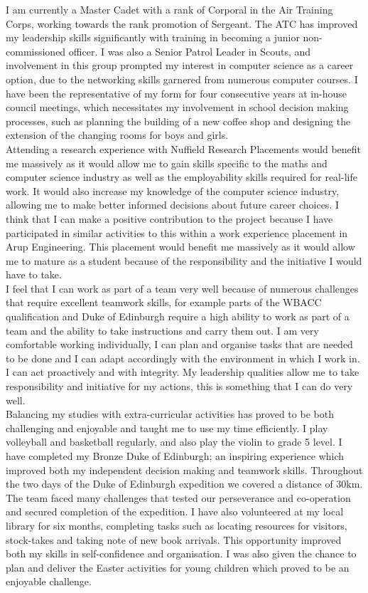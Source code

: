 \documentclass{article}
\begin{document}
I am currently a Master Cadet with a rank of Corporal in the Air
Training Corps, working towards the rank promotion of Sergeant. The ATC has
improved my leadership skills significantly with training in becoming a junior
non-commissioned officer. I was also a Senior Patrol Leader in Scouts, and
involvement in this group prompted my interest in computer science as a career
option, due to the networking skills garnered from numerous computer courses. I
have been the representative of my form for four consecutive years at in-house
council meetings, which necessitates my involvement in school decision making
processes, such as planning the building of a new coffee shop and designing the
extension of the changing rooms for boys and girls.\\

Attending a research experience with Nuffield Research Placements would benefit
me massively as it would allow me to gain skills specific to the maths and
computer science industry as well as the employability skills required for
real-life work. It would also increase my knowledge of the computer science
industry, allowing me to make better informed decisions about future career
choices. I think that I can make a positive contribution to the project because
I have participated in similar activities to this within a work experience
placement in Arup Engineering. This placement would benefit me massively as it
would allow me to mature as a student because of the responsibility and the
initiative I would have to take.\\

I feel that I can work as part of a team very well because of numerous
challenges that require excellent teamwork skills, for example parts of the
WBACC qualification and Duke of Edinburgh require a high ability to work as part
of a team and the ability to take instructions and carry them out. I am very
comfortable working individually, I can plan and organise tasks that are needed
to be done and I can adapt accordingly with the environment in which I work in.
I can act proactively and with integrity. My leadership qualities allow me to
take responsibility and initiative for my actions, this is something that I can
do very well.\\

Balancing my studies with extra-curricular activities has proved to be both
challenging and enjoyable and taught me to use my time efficiently. I play
volleyball and basketball regularly, and also play the violin to grade 5 level.
I have completed my Bronze Duke of Edinburgh; an inspiring experience which
improved both my independent decision making and teamwork skills. Throughout the
two days of the Duke of Edinburgh expedition we covered a distance of 30km. The
team faced many challenges that tested our perseverance and co-operation and
secured completion of the expedition. I have also volunteered at my local
library for six months, completing tasks such as locating resources for
visitors, stock-takes and taking note of new book arrivals. This opportunity
improved both my skills in self-confidence and organisation. I was also given
the chance to plan and deliver the Easter activities for young children which
proved to be an enjoyable challenge.\\
\end{document}
